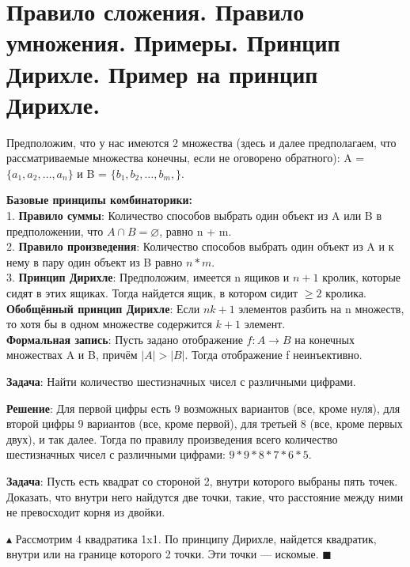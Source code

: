 \setcounter{section}{25}

\section{Правило сложения. Правило умножения. Примеры. Принцип Дирихле. Пример на принцип Дирихле.}
Предположим, что у нас имеются 2 множества (здесь и далее предполагаем, что рассматриваемые множества конечны, если не оговорено обратного): A = $\{ a_1, a_2, \dots, a_n \}$ и B = $\{ b_1, b_2, \dots, b_m, \}$. \par
\textbf{Базовые принципы комбинаторики:} \\
1. \textbf{Правило суммы}: Количество способов выбрать один объект из A или B в предположении, что $A \cap B = \varnothing$, равно n + m. \\
2. \textbf{Правило произведения}: Количество способов выбрать один объект из A и к нему в пару один объект из B равно $n*m$.\\
3. \textbf{Принцип Дирихле}: Предположим, имеется n ящиков и $n+1$ кролик, которые сидят в этих ящиках. Тогда найдется ящик, в котором сидит $\geqslant 2$ кролика. \\
\textbf{Обобщённый принцип Дирихле}: Если $nk + 1$ элементов разбить на n множеств, то хотя бы в одном множестве содержится $k+1$ элемент.  \\
\textbf{Формальная запись}: Пусть задано отображение $f: A \rightarrow B$ на конечных множествах A и B, причём $|A| > |B|$. Тогда отображение f неинъективно. \\ \par
\textbf{Задача}: Найти количество шестизначных чисел с различными цифрами.\par \textbf{Решение}: Для первой цифры есть 9 возможных вариантов (все, кроме нуля), для второй цифры 9 вариантов (все, кроме первой), для третьей 8 (все, кроме первых двух), и так далее. Тогда по правилу произведения всего количество шестизначных чисел с различными цифрами: $9*9*8*7*6*5$. \par
\textbf{Задача}: Пусть есть квадрат со стороной 2, внутри которого выбраны пять точек. Доказать, что внутри него найдутся две точки, такие, что расстояние между ними не превосходит корня из двойки. \par
$\blacktriangle$
Рассмотрим 4 квадратика 1x1. По принципу Дирихле, найдется квадратик, внутри или на границе которого 2 точки. Эти точки — искомые.
$\blacksquare$

